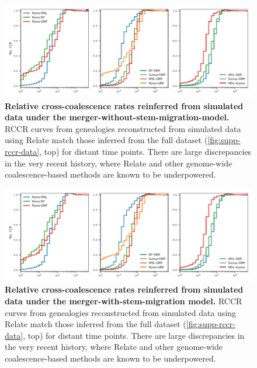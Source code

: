 \documentclass[]{article}
\begin{document}
\begin{figure}[ht]
    \centering
    \includegraphics[width=\textwidth]{figures/supp-relate-rccr-merger-without-stem-migration}
    \caption{
        \textbf{Relative cross-coalescence rates reinferred from simulated data
        under the merger-without-stem-migration-model.} RCCR curves from genealogies
        reconstructed from simulated data using Relate match those inferred
        from the full dataset (\ref{fig:supp-rccr-data}, top) for distant
        time points. There are large discrepancies in the very recent history,
        where Relate and other genome-wide coalescence-based methods are known
        to be underpowered.
    }
    \label{fig:supp-rccr-merger-without-stem-migration}
\end{figure}

\begin{figure}[ht]
    \centering
    \includegraphics[width=\textwidth]{figures/supp-relate-rccr-merger-with-stem-migration}
    \caption{
        \textbf{Relative cross-coalescence rates reinferred from simulated data
        under the merger-with-stem-migration model.} RCCR curves from genealogies
        reconstructed from simulated data using Relate match those inferred
        from the full dataset (\ref{fig:supp-rccr-data}, top) for distant
        time points. There are large discrepancies in the very recent history,
        where Relate and other genome-wide coalescence-based methods are known
        to be underpowered.
    }
    \label{fig:supp-rccr-merger-with-stem-migration}
\end{figure}
\end{document}
